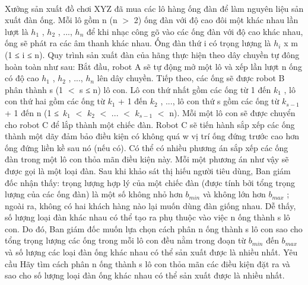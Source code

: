  

Xưởng sản xuất đồ chơi XYZ đã mua các lô hàng ống đàn để làm nguyên liệu sản xuất đàn ống. Mỗi lô gồm n (n $>$ 2) ống đàn với độ cao đôi một khác nhau lần lượt là $h_{1}$ , $h_{2}$ , ..., $h_{n}$ để khi nhạc công gõ vào các ống đàn với độ cao khác nhau, ống sẽ phát ra các âm thanh khác nhau. Ống đàn thứ i có trọng lượng là $h_{i}$ x m (1 ≤ i ≤ n). Quy trình sản xuất đàn của hãng thực hiện theo dây chuyền tự đông hoàn toàn như sau: Bắt đầu, robot A sẽ tự động mở một lô và xếp lần lượt n ống có độ cao $h_{1}$ , $h_{2}$ , ..., $h_{n}$ lên dây chuyền. Tiếp theo, các ống sẽ được robot B phân thành s (1 $<$ s ≤ n) lô con. Lô con thứ nhất gồm các ống từ 1 đến $k_{1}$ , lô con thứ hai gồm các ống từ $k_{1}$ + 1 đến $k_{2}$ , ..., lô con thứ s gồm các ống từ $k_{s-1}$ + 1 đến n (1 ≤ $k_{1}$ $<$ $k_{2}$ $<$ ... $<$ $k_{s-1}$ $<$ n). Mỗi một lô con sẽ được chuyển cho robot C để lắp thành một chiếc đàn. Robot C sẽ tiến hành sắp xếp các ống thành một dãy đảm bảo điều kiện có không quá w vị trí ống đứng trước cao hơn ống đứng liền kề sau nó (nếu có). Có thể có nhiều phương án sắp xếp các ống đàn trong một lô con thỏa mãn điều kiện này. Mỗi một phương án như vậy sẽ được gọi là một loại đàn. Sau khi khảo sát thị hiếu người tiêu dùng, Ban giám đốc nhận thấy: trọng lượng hợp lý của một chiếc đàn (được tính bởi tổng trọng lượng của các ống đàn) là một số không nhỏ hơn $b_{min}$ và không lớn hơn $b_{max}$ ; ngoài ra, không có hai khách hàng nào lại muốn dùng đàn giống nhau. Dễ thấy, số lượng loại đàn khác nhau có thể tạo ra phụ thuộc vào việc n ống thành s lô con. Do đó, Ban giám đốc muốn lựa chọn cách phân n ống thành s lô con sao cho tổng trọng lượng các ống trong mỗi lô con đều nằm trong đoạn từ $b_{min}$ đến $b_{max}$ và số lượng các loại đàn ống khác nhau có thể sản xuất được là nhiều nhất.
Yêu cầu
Hãy tìm cách phân n ống thành s lô con thỏa mãn các điều kiện đặt ra và sao cho số lượng loại đàn ống khác nhau có thể sản xuất được là nhiều nhất.